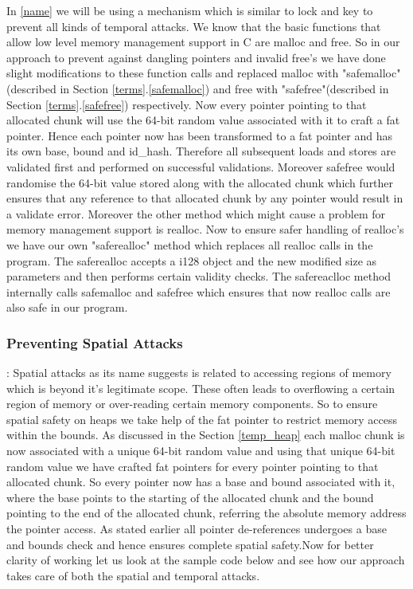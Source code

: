 In \ref{name} we will be using a mechanism which is similar to lock and key to prevent all kinds of temporal attacks. We know that the basic functions that allow low level  memory management support in C are malloc and free. So in our approach to prevent against dangling pointers and invalid free's we have done slight modifications to these function calls and replaced malloc with "safemalloc"(described in Section \ref{terms}.\ref{safemalloc}) and free with "safefree"(described in Section \ref{terms}.\ref{safefree}) respectively. Now every pointer pointing to that allocated chunk will use the 64-bit random value associated with it to craft a fat pointer. Hence each pointer now has been transformed to a fat pointer and has its own base, bound and id\_hash. Therefore all subsequent loads and stores are validated first and performed on successful validations. Moreover safefree would randomise the 64-bit value stored along with the allocated chunk which further ensures that any reference to that allocated chunk by any pointer would result in a validate error. Moreover the other method which might cause a problem for memory management support is realloc. Now to ensure safer handling of realloc's we have our own "saferealloc" method which replaces all realloc calls in the program. The saferealloc accepts a i128 object and the new modified size as parameters and then performs certain validity checks. The safereaclloc method internally calls safemalloc and safefree which ensures that now realloc calls are also safe in our program.

\subsubsection{Preventing Spatial Attacks} : Spatial attacks as its name suggests is related to accessing regions of memory which is beyond it's legitimate scope. These often leads to overflowing a certain region of memory or over-reading certain memory components. So to ensure spatial safety on heaps we take help of the fat pointer to restrict memory access within the bounds. As discussed in the Section \ref{temp_heap} each malloc chunk is now associated with a unique 64-bit random value and using that unique 64-bit random value we have crafted fat pointers for every pointer pointing to that allocated chunk. So every pointer now has a base and bound associated with it, where the base points to the starting of the allocated chunk and the bound pointing to the end of the allocated chunk, referring the absolute memory address the pointer access. As stated earlier all pointer de-references undergoes a base and bounds check and hence ensures complete spatial safety.Now for better clarity of working let us look at the sample code below and see how our approach takes care of both the spatial and temporal attacks.

